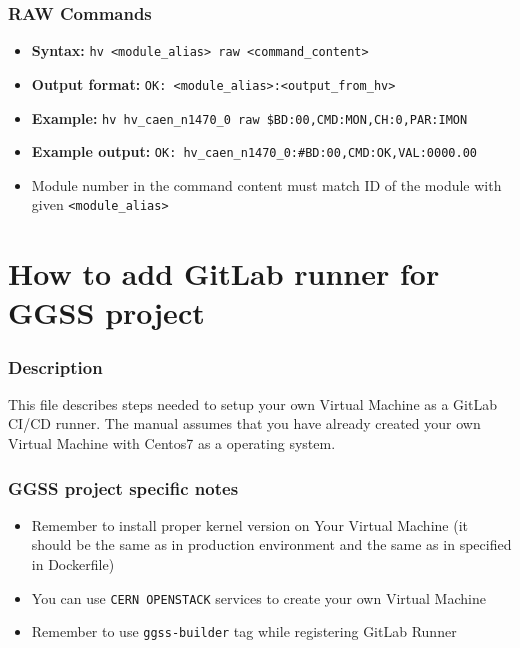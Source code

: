 \subsubsection*{RAW Commands}
\begin{itemize}
    \item \textbf{Syntax:} \lstinline{hv <module_alias> raw <command_content>}
    \item \textbf{Output format:} \lstinline{OK: <module_alias>:<output_from_hv>}
    \item \textbf{Example:} \lstinline{hv hv_caen_n1470_0 raw $BD:00,CMD:MON,CH:0,PAR:IMON}
    \item \textbf{Example output:} \lstinline{OK: hv_caen_n1470_0:#BD:00,CMD:OK,VAL:0000.00}
    \item Module number in the command content must match ID of the module with given \lstinline{<module_alias>}
\end{itemize}


\clearpage

\section{How to add GitLab runner for GGSS project}

\subsubsection*{Description}

This file describes steps needed to setup your own Virtual Machine as a GitLab CI/CD runner. The manual assumes that you have already created your own Virtual Machine with Centos7 as a operating system.

\subsubsection*{GGSS project specific notes}

\begin{itemize}
    \item Remember to install proper kernel version on Your Virtual Machine (it should be the same as in production environment and the same as in specified in Dockerfile)
    \item You can use \lstinline{CERN OPENSTACK} services to create your own Virtual Machine
    \item Remember to use \lstinline{ggss-builder} tag while registering GitLab Runner
\end{itemize}

